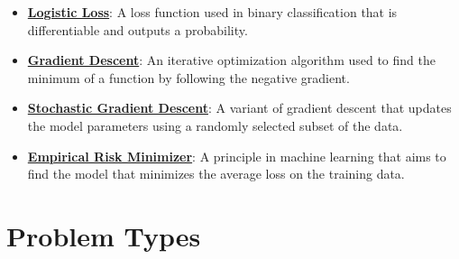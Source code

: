 \documentclass{article}%
\begin{document}
\begin{itemize}[leftmargin=*]
\item \href{https://purdue.brightspace.com/d2l/common/assets/pdfjs-d2l-dist/1.0.14-legacy/web/viewer.html?file=\%2Fcontent\%2Fenforced\%2F1095467-wl.202510.CS.24300.001\%2F05L2-ML Basics.pdf\%3Fou\%3D1095467\&lang=en-us\&container=d2l-fileviewer-rendered-pdf\&fullscreen=d2l-fileviewer-rendered-pdf-dialog\&height=667#page=27}{\textbf{Logistic Loss}}: A loss function used in binary classification that is differentiable and outputs a probability.%
\item \href{https://purdue.brightspace.com/d2l/common/assets/pdfjs-d2l-dist/1.0.14-legacy/web/viewer.html?file=\%2Fcontent\%2Fenforced\%2F1095467-wl.202510.CS.24300.001\%2F05L2-ML Basics.pdf\%3Fou\%3D1095467\&lang=en-us\&container=d2l-fileviewer-rendered-pdf\&fullscreen=d2l-fileviewer-rendered-pdf-dialog\&height=667#page=28}{\textbf{Gradient Descent}}: An iterative optimization algorithm used to find the minimum of a function by following the negative gradient.%
\item \href{https://purdue.brightspace.com/d2l/common/assets/pdfjs-d2l-dist/1.0.14-legacy/web/viewer.html?file=\%2Fcontent\%2Fenforced\%2F1095467-wl.202510.CS.24300.001\%2F05L2-ML Basics.pdf\%3Fou\%3D1095467\&lang=en-us\&container=d2l-fileviewer-rendered-pdf\&fullscreen=d2l-fileviewer-rendered-pdf-dialog\&height=667#page=29}{\textbf{Stochastic Gradient Descent}}: A variant of gradient descent that updates the model parameters using a randomly selected subset of the data.%
\item \href{https://purdue.brightspace.com/d2l/common/assets/pdfjs-d2l-dist/1.0.14-legacy/web/viewer.html?file=\%2Fcontent\%2Fenforced\%2F1095467-wl.202510.CS.24300.001\%2F05L2-ML Basics.pdf\%3Fou\%3D1095467\&lang=en-us\&container=d2l-fileviewer-rendered-pdf\&fullscreen=d2l-fileviewer-rendered-pdf-dialog\&height=667#page=15}{\textbf{Empirical Risk Minimizer}}: A principle in machine learning that aims to find the model that minimizes the average loss on the training data.%
\end{itemize}

%
\section{Problem Types}%
\label{sec:ProblemTypes}%
\end{document}
